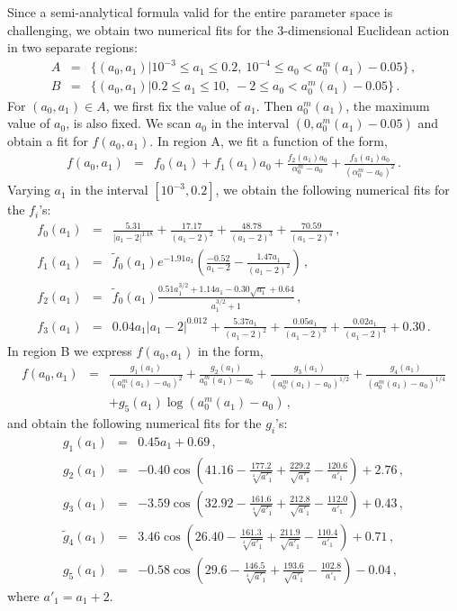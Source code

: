 \documentclass[a4paper,11pt]{article}
\begin{document}
 Since a semi-analytical formula valid for the entire parameter space is challenging, we obtain two numerical fits
for the 3-dimensional Euclidean action in two separate regions:
\begin{eqnarray}
A &=& \{ (a_0, a_1) | 10^{-3} \leqslant  a_1 \leqslant 0.2 ,~
10^{-4} \leqslant a_0 < a_0^m (a_1) -0.05 \} \,, \nonumber\\
B &=& \{ (a_0, a_1) | 0.2\leqslant  a_1 \leqslant 10 ,~
-2 \leqslant a_0 < a_0^m (a_1) -0.05 \} \,.
\end{eqnarray}
For $(a_0,a_1) \in A$, we first fix the value of $a_1$. Then $a_0^m(a_1)$, the maximum value of $a_0$, is also fixed. We scan $a_0$ in the interval $(0, a_0^m(a_1)-0.05)$ and obtain a fit for $f(a_0,a_1)$. In region A, we fit a function of the form,
\begin{eqnarray}\label{eq:semi_analytical_1}
f(a_0,a_1) &=& f_0(a_1) + f_1(a_1) a_0 + \frac{f_2(a_1) a_0}{\alpha^m_0-a_0}
 + \frac{f_3(a_1) a_0}{(\alpha^m_0-a_0)^2} \,.
\end{eqnarray}
Varying $a_1$ in the interval $[10^{-3}, 0.2]$, we obtain the following numerical fits for the $f_i$'s:
\begin{eqnarray}
f_0(a_1) &=& \frac{5.31}{\left| a_1-2\right| ^{1.18}}+\frac{17.17}{(a_1-2)^2}+\frac{48.78}{(a_1-2)^3}
+\frac{70.59}{(a_1-2)^4} \,, \nonumber\\
f_1(a_1) &=& \widetilde{f}_0(a_1) e^{-1.91 a_1} \left(\frac{-0.52}{a_1-2}-\frac{1.47 a_1}{(a_1-2)^2}\right) \,, \nonumber\\
f_2(a_1) &=& \widetilde{f}_0(a_1) \frac{0.51 a_1^{3/2}+1.14 a_1-0.30 \sqrt{a_1}+0.64}{a_1^{3/2}+1} \,,\nonumber\\
f_3(a_1) &=& 0.04 a_1 \left| a_1-2\right| ^{0.012}+\frac{5.37 a_1}{(a_1-2)^2}+\frac{0.05 a_1}{(a_1-2)^3}  +\frac{0.02 a_1}{(a_1-2)^4} +0.30 \, .
\end{eqnarray}
In region B we express $f(a_0,a_1)$ in the form,
\begin{eqnarray} \label{eq:semi_analytical_2}
f(a_0,a_1) &=& \frac{g_1(a_1)}{(a_0^m(a_1)-a_0)^2} +
\frac{g_2(a_1)}{a_0^m(a_1)-a_0} 
+ \frac{g_3(a_1)}{(a_0^m(a_1)-a_0)^{1/2}}
+ \frac{g_4(a_1)}{(a_0^m(a_1)-a_0)^{1/4}} \nonumber\\
&&+ g_5(a_1) \log(a_0^m(a_1)-a_0) \,  ,
\end{eqnarray}
and obtain the following numerical fits for the $g_i$'s:
\begin{eqnarray}
g_1(a_1)&=&0.45 a_1+0.69\,,
\nonumber\\
g_2(a_1)&=&-0.40 \cos \left(41.16 -\frac{177.2}{\sqrt[4]{a'_1}}+\frac{229.2}{\sqrt{a'_1}}-\frac{120.6}{a'_1}\right)+2.76\,,
\nonumber\\
g_3(a_1)&=&-3.59 \cos \left(32.92 -\frac{161.6}{\sqrt[4]{a'_1}}+\frac{212.8}{\sqrt{a'_1}}-\frac{112.0}{a'_1}\right)+0.43\,,
\nonumber\\
\widetilde{g}_4(a_1)&=&3.46 \cos \left(26.40 -\frac{161.3}{\sqrt[4]{a'_1}}+\frac{211.9}{\sqrt{a'_1}}-\frac{110.4}{a'_1}\right) +0.71\,,
\nonumber\\
g_5(a_1)&=&-0.58 \cos \left(29.6 -\frac{146.5}{\sqrt[4]{a'_1}}+\frac{193.6}{\sqrt{a'_1}}-\frac{102.8}{a'_1}\right) -0.04\,,
\end{eqnarray}
where $a'_1 = a_1 +2$. 
\end{document}
